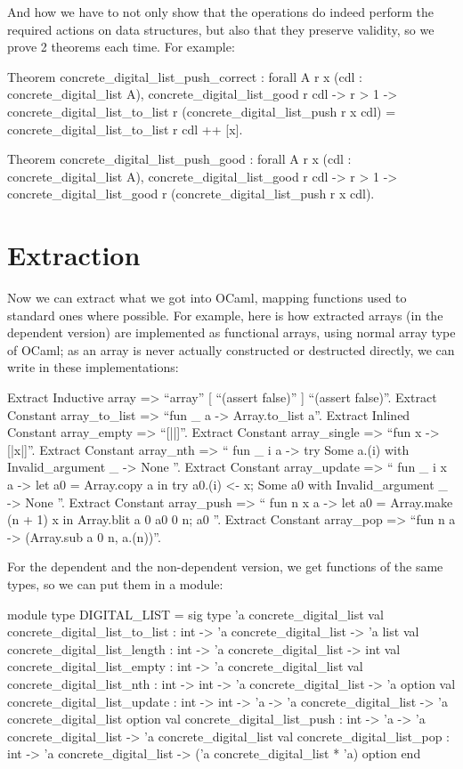 \documentclass{article}
\begin{document}
And how we have to not only show that the operations do indeed perform the required actions on data structures, but also that they preserve validity, so we prove 2 theorems each time. For example:

\begin{coq}
Theorem concrete_digital_list_push_correct :
  forall {A} r x (cdl : concrete_digital_list A),
  concrete_digital_list_good r cdl ->
  r > 1 ->
  concrete_digital_list_to_list r (concrete_digital_list_push r x cdl) =
    concrete_digital_list_to_list r cdl ++ [x].

Theorem concrete_digital_list_push_good :
  forall {A} r x (cdl : concrete_digital_list A),
  concrete_digital_list_good r cdl ->
  r > 1 ->
  concrete_digital_list_good r (concrete_digital_list_push r x cdl).
\end{coq}

\section{Extraction}

Now we can extract what we got into OCaml, mapping functions used to standard ones where possible. For example, here is how extracted arrays (in the dependent version) are implemented as functional arrays, using normal array type of OCaml; as an array is never actually constructed or destructed directly, we can write  in these implementations:

\begin{coq}
Extract Inductive array => ``array'' [ ``(assert false)'' ] ``(assert false)''.
Extract Constant array_to_list => ``fun _ a -> Array.to_list a''.
Extract Inlined Constant array_empty => ``[||]''.
Extract Constant array_single => ``fun x -> [|x|]''.
Extract Constant array_nth => ``
  fun _ i a ->
    try Some a.(i)
    with Invalid_argument _ -> None
''.
Extract Constant array_update => ``
  fun _ i x a ->
    let a0 = Array.copy a in
    try
      a0.(i) <- x;
      Some a0
    with Invalid_argument _ -> None
''.
Extract Constant array_push => ``
  fun n x a ->
    let a0 = Array.make (n + 1) x in
    Array.blit a 0 a0 0 n;
    a0
''.
Extract Constant array_pop => ``fun n a -> (Array.sub a 0 n, a.(n))''.
\end{coq}

For the dependent and the non-dependent version, we get functions of the same types, so we can put them in a module:

\begin{coq}
module type DIGITAL_LIST = sig
  type 'a concrete_digital_list
  val concrete_digital_list_to_list : int -> 'a concrete_digital_list -> 'a list
  val concrete_digital_list_length : int -> 'a concrete_digital_list -> int
  val concrete_digital_list_empty : int -> 'a concrete_digital_list
  val concrete_digital_list_nth : int -> int -> 'a concrete_digital_list -> 'a option
  val concrete_digital_list_update : int -> int -> 'a -> 'a concrete_digital_list -> 'a concrete_digital_list option
  val concrete_digital_list_push : int -> 'a -> 'a concrete_digital_list -> 'a concrete_digital_list
  val concrete_digital_list_pop : int -> 'a concrete_digital_list -> ('a concrete_digital_list * 'a) option
end
\end{coq}
\end{document}
